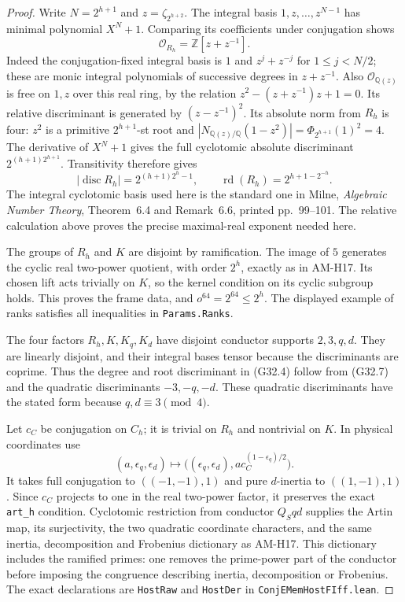 \begin{proof}
Write $N=2^{h+1}$ and $z=\zeta_{2^{h+2}}$.
The integral basis $1,z,\ldots,z^{N-1}$ has minimal
polynomial $X^N+1$.  Comparing its coefficients under
conjugation shows
\[
 \mathcal O_{R_h}=\mathbb Z[z+z^{-1}].
\]
Indeed the conjugation-fixed integral basis is $1$ and
$z^j+z^{-j}$ for $1\leq j<N/2$; these are monic integral
polynomials of successive degrees in $z+z^{-1}$.
Also $\mathcal O_{\mathbb Q(z)}$ is free on $1,z$ over
this real ring, by the relation
$z^2-(z+z^{-1})z+1=0$.
Its relative discriminant is generated by
$(z-z^{-1})^2$.  Its absolute norm from $R_h$ is four:
$z^2$ is a primitive $2^{h+1}$-st root and
$|N_{\mathbb Q(z)/\mathbb Q}(1-z^2)|=\Phi_{2^{h+1}}(1)^2=4$.
The derivative of $X^N+1$ gives the full cyclotomic
absolute discriminant $2^{(h+1)2^{h+1}}$.
Transitivity therefore gives
\[
 |\operatorname{disc}R_h|=2^{(h+1)2^h-1},
 \qquad \operatorname{rd}(R_h)=2^{h+1-2^{-h}}.
                                                               \tag{G32.7}
\]
The integral cyclotomic basis used here is the standard
one in Milne, \emph{Algebraic Number Theory},
Theorem~6.4 and Remark~6.6, printed pp.~99--101.
The relative calculation above proves the precise
maximal-real exponent needed here.

The groups of $R_h$ and $K$ are disjoint by ramification.
The image of $5$ generates the cyclic real two-power
quotient, with order $2^h$, exactly as in AM-H17.
Its chosen lift acts trivially on $K$, so the kernel
condition on its cyclic subgroup holds.  This proves
the frame data, and $o^{64}=2^{64}\leq2^h$.
The displayed example of ranks satisfies all inequalities
in \texttt{Params.Ranks}.

The four factors $R_h,K,K_q,K_d$ have disjoint conductor
supports $2,3,q,d$.  They are linearly disjoint, and their
integral bases tensor because the discriminants are
coprime.  Thus the degree and root discriminant in
(G32.4) follow from (G32.7) and the quadratic discriminants
$-3,-q,-d$.  These quadratic discriminants have the stated
form because $q,d\equiv3\pmod4$.

Let $c_C$ be conjugation on $C_h$; it is trivial on $R_h$
and nontrivial on $K$.  In physical coordinates use
\[
 (a,\epsilon_q,\epsilon_d)\longmapsto
 \bigl((\epsilon_q,\epsilon_d),
        a c_C^{(1-\epsilon_q)/2}\bigr).              \tag{G32.8}
\]
It takes full conjugation to $((-1,-1),1)$ and pure
$d$-inertia to $((1,-1),1)$.  Since $c_C$ projects to
one in the real two-power factor, it preserves the exact
\texttt{art\_h} condition.  Cyclotomic restriction from
conductor $Q_Sqd$ supplies the Artin map, its surjectivity,
the two quadratic coordinate characters, and the same
inertia, decomposition and Frobenius dictionary as AM-H17.
This dictionary includes the ramified primes: one removes
the prime-power part of the conductor before imposing the
congruence describing inertia, decomposition or Frobenius.
The exact declarations are \texttt{HostRaw} and
\texttt{HostDer} in
\texttt{ConjEMemHostFIff.lean}.


\end{proof}
